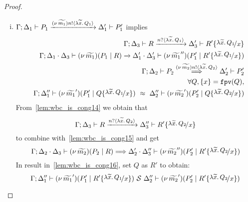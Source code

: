 \begin{proof}
\begin{enumerate}
\begin{enumerate}[i.]
				\item
						$\Gamma; \Delta_1 \vdash P_1 \xrightarrow{(\nu\, \widetilde{m_1}) n ! \langle \lambda \widetilde{x}.\,Q_1 \rangle} \Delta_1' \vdash P_1'$
						implies
						\begin{eqnarray}
							& & \horel{\Gamma}{\Delta_3}{R}
							{\by{\bactinp{n}{\abs{\widetilde{x}} {Q_1}}}}{\Delta_3'}
							{R' \subst{\abs{\widetilde{x}}{Q_1}}{x}}
							\label{lem:wbc_is_cong14}\\
							& & \horel{\Gamma}{\Delta_1 \cat \Delta_3}{\newsp{\widetilde{m_1}}{P_1 \Par R}}
							{\by{}}{\Delta_1' \cat \Delta_3'}
							{\newsp{\widetilde{m_1}''}{P_1' \Par R' \subst{\abs{\widetilde{x}}{Q_1}}{x}}}
							\nonumber \\
							& & \horel{\Gamma}{\Delta_2}{P_2}
							{\By{\news{\widetilde{m_2}} \bactout{n}{\abs{\widetilde{x}}{Q_2}}}}
							{\Delta_2'}{P_2'}
							\label{lem:wbc_is_cong15}\\
							& & \forall Q, \set{x} = \fpv{Q}, \nonumber \\
							& & \horel{\Gamma}{\Delta_1''}{\newsp{\widetilde{m_1}'}{P_1' \Par Q \subst{\abs{\widetilde{x}}{Q_1}}{x}}}
							{\ \wbc\ }
							{\Delta_2''}{\newsp{\widetilde{m_2}'}{P_2' \Par Q \subst{\abs{\widetilde{x}}{Q_2}}{x}}}
							\label{lem:wbc_is_cong16}
						\end{eqnarray}
						From~\eqref{lem:wbc_is_cong14} %
						we obtain that
						\[
							\horel{\Gamma}{\Delta_3}{R}{\by{\bactinp{n}{\abs{\widetilde{x}} {Q_2}}}}{\Delta_3''}{R' \subst{\abs{\widetilde{x}}{Q_2}}{x}}
						\]
						\noi to combine with~\eqref{lem:wbc_is_cong15} and get
						\[
							\horel{\Gamma}{\Delta_2 \cat \Delta_3}{\newsp{\widetilde{m_2}}{P_2 \Par R}}
							{\By{}}
							{\Delta_2' \cat \Delta_3''}{\newsp{\widetilde{m_2}''}{P_2' \Par R' \subst{\abs{\widetilde{x}}{Q_2}}{x}}}
						\]
						\noi In result in~\eqref{lem:wbc_is_cong16}, set $Q$ as $R'$ to obtain:
						\[
							\horel{\Gamma}{\Delta_1''}{\newsp{\widetilde{m_1}'}{P_1' \Par R' \subst{\abs{\widetilde{x}}{Q_1}}{x}}}
							{\ \mathcal{S}\ }{ \Delta_2''}
							{\newsp{\widetilde{m_2}'}{P_2' \Par R' \subst{\abs{\widetilde{x}}{Q_2}}{x}}}
						\]


\end{enumerate}
\end{enumerate}
\end{proof}
